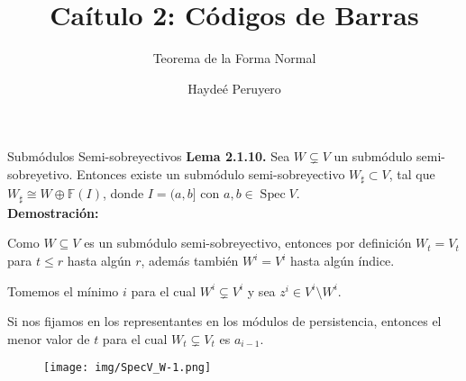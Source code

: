 \documentclass{beamer}
\title{Caítulo 2: Códigos de Barras}
\subtitle{Teorema de la Forma Normal} %
\author{Haydeé Peruyero}
\DeclareMathOperator{\Spec}{Spec}
\newcommand{\setm}{\setminus}
\def\F {\mathbb{F}}
\begin{document}
\frenchspacing


  \frame{\maketitle}


%


\begin{frame}{Submódulos Semi-sobreyectivos}
\textbf{{\color{green}Lema 2.1.10.}} Sea $W \subsetneq V$ un submódulo semi-sobreyetivo. Entonces existe un submódulo semi-sobreyectivo $W_{\sharp} \subset V$, tal que $W_\sharp \cong W\oplus \F(I)$, donde $I = (a,b]$ con $a,b\in \Spec V$.
\pause
\\[0.5cm]
\textbf{Demostración:}

Como $W \subseteq V$ es un submódulo semi-sobreyectivo, entonces por definición $W_t=V_t$ para $t\leq r$ hasta algún $r$, \pause además también $W^i = V^i$ hasta algún índice. \pause

Tomemos el mínimo $i$ para el cual $W^i \subsetneq V^i$ y sea $z^i \in V^i \setm W^i$.

\end{frame}


\begin{frame}
Si nos fijamos en los representantes en los módulos de persistencia, entonces el menor valor de $t$ para el cual $W_t \subsetneq V_t$ es $a_{i-1}$.

\begin{figure}[!ht]
	\centering
	\texttt{[image: img/SpecV\_W-1.png]}
	\label{fig: spec_V_W}
\end{figure}

\end{frame}
\end{document}
